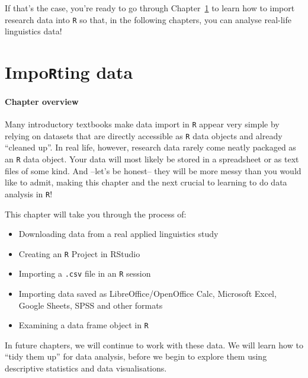 \documentclass[
  letterpaper,
  DIV=11,
  numbers=noendperiod]{scrreprt}
\providecommand{\tightlist}{%
  \setlength{\itemsep}{0pt}\setlength{\parskip}{0pt}}
\begin{document}
If that's the case, you're ready to go through
Chapter~\ref{sec-ImportingData} to learn how to import research data
into \texttt{R} so that, in the following chapters, you can analyse
real-life linguistics data!


\chapter{\texorpdfstring{Impo\texttt{R}ting
data}{ImpoRting data}}\label{sec-ImportingData}

\subsubsection*{\texorpdfstring{\textbf{Chapter
overview}}{Chapter overview}}\label{chapter-overview-5}

Many introductory textbooks make data import in \texttt{R} appear very
simple by relying on datasets that are directly accessible as \texttt{R}
data objects and already ``cleaned up''. In real life, however, research
data rarely come neatly packaged as an \texttt{R} data object. Your data
will most likely be stored in a spreadsheet or as text files of some
kind. And --let's be honest-- they will be more messy than you would
like to admit, making this chapter and the next crucial to learning to
do data analysis in \texttt{R}!

This chapter will take you through the process of:

\begin{itemize}
\tightlist
\item
  Downloading data from a real applied linguistics study
\item
  Creating an \texttt{R} Project in RStudio
\item
  Importing a \texttt{.csv} file in an \texttt{R} session
\item
  Importing data saved as LibreOffice/OpenOffice Calc, Microsoft Excel,
  Google Sheets, SPSS and other formats
\item
  Examining a data frame object in \texttt{R}
\end{itemize}

In future chapters, we will continue to work with these data. We will
learn how to ``tidy them up'' for data analysis, before we begin to
explore them using descriptive statistics and data visualisations.
\end{document}
